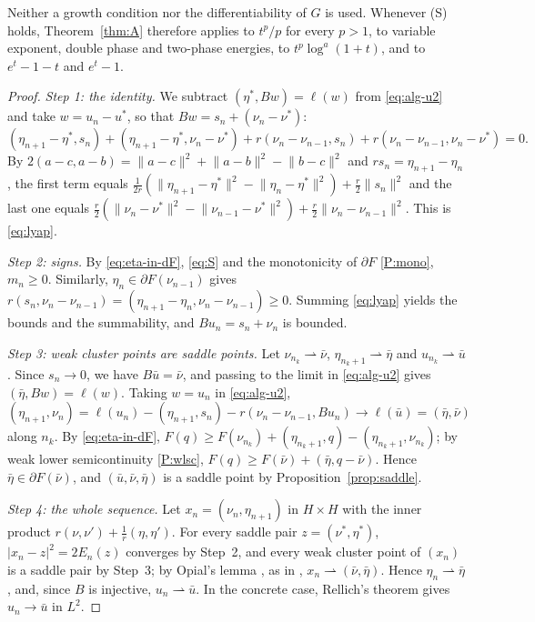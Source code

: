 \documentclass[11pt]{amsart}
\theoremstyle{definition}
\theoremstyle{remark}
\numberwithin{equation}{section}
\newcommand{\abs}[1]{\lvert #1\rvert}
\newcommand{\norm}[1]{\lVert #1\rVert}
\newcommand{\weak}{\rightharpoonup}
\begin{document}
Neither a growth condition nor the differentiability of $G$ is used. Whenever (S) holds, Theorem~\ref{thm:A} therefore applies to $t^p/p$ for every $p>1$, to variable exponent, double phase and two-phase energies, to $t^p\log^a(1+t)$, and to $e^t-1-t$ and $e^t-1$.

\begin{proof}
\emph{Step 1: the identity.} We subtract $(\eta^*,Bw)=\ell(w)$ from \eqref{eq:alg-u2} and take $w=u_n-u^*$, so that $Bw=s_n+(\nu_n-\nu^*)$:
\[
(\eta_{n+1}-\eta^*,s_n)+(\eta_{n+1}-\eta^*,\nu_n-\nu^*)+r(\nu_n-\nu_{n-1},s_n)+r(\nu_n-\nu_{n-1},\nu_n-\nu^*)=0 .
\]
By $2(a-c,a-b)=\norm{a-c}^2+\norm{a-b}^2-\norm{b-c}^2$ and $rs_n=\eta_{n+1}-\eta_n$, the first term equals $\frac1{2r}(\norm{\eta_{n+1}-\eta^*}^2-\norm{\eta_n-\eta^*}^2)+\frac r2\norm{s_n}^2$ and the last one equals $\frac r2(\norm{\nu_n-\nu^*}^2-\norm{\nu_{n-1}-\nu^*}^2)+\frac r2\norm{\nu_n-\nu_{n-1}}^2$. This is \eqref{eq:lyap}.

\emph{Step 2: signs.} By \eqref{eq:eta-in-dF}, \eqref{eq:S} and the monotonicity of $\partial F$ \ref{P:mono}, $m_n\ge0$. Similarly, $\eta_n\in\partial F(\nu_{n-1})$ gives $r(s_n,\nu_n-\nu_{n-1})=(\eta_{n+1}-\eta_n,\nu_n-\nu_{n-1})\ge0$. Summing \eqref{eq:lyap} yields the bounds and the summability, and $Bu_n=s_n+\nu_n$ is bounded.

\emph{Step 3: weak cluster points are saddle points.} Let $\nu_{n_k}\weak\bar\nu$, $\eta_{n_k+1}\weak\bar\eta$ and $u_{n_k}\weak\bar u$. Since $s_n\to0$, we have $B\bar u=\bar\nu$, and passing to the limit in \eqref{eq:alg-u2} gives $(\bar\eta,Bw)=\ell(w)$. Taking $w=u_n$ in \eqref{eq:alg-u2}, $(\eta_{n+1},\nu_n)=\ell(u_n)-(\eta_{n+1},s_n)-r(\nu_n-\nu_{n-1},Bu_n)\to\ell(\bar u)=(\bar\eta,\bar\nu)$ along $n_k$. By \eqref{eq:eta-in-dF}, $F(q)\ge F(\nu_{n_k})+(\eta_{n_k+1},q)-(\eta_{n_k+1},\nu_{n_k})$; by weak lower semicontinuity \ref{P:wlsc}, $F(q)\ge F(\bar\nu)+(\bar\eta,q-\bar\nu)$. Hence $\bar\eta\in\partial F(\bar\nu)$, and $(\bar u,\bar\nu,\bar\eta)$ is a saddle point by Proposition~\ref{prop:saddle}.

\emph{Step 4: the whole sequence.} Let $x_n=(\nu_n,\eta_{n+1})$ in $H\times H$ with the inner product $r(\nu,\nu')+\frac1r(\eta,\eta')$. For every saddle pair $z=(\nu^*,\eta^*)$, $\abs{x_n-z}^2=2E_n(z)$ converges by Step~2, and every weak cluster point of $(x_n)$ is a saddle pair by Step~3; by Opial's lemma \cite{Opial1967}, as in \cite[Ch.~VI, \S7]{Glowinski1984ChVI}, $x_n\weak(\bar\nu,\bar\eta)$. Hence $\eta_n\weak\bar\eta$, and, since $B$ is injective, $u_n\weak\bar u$. In the concrete case, Rellich's theorem gives $u_n\to\bar u$ in $L^2$.
\end{proof}
\end{document}
